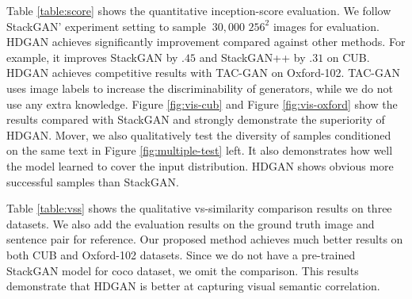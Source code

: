 \documentclass[10pt,twocolumn,letterpaper]{article}
\begin{document}
Table \ref{table:score} shows the quantitative inception-score evaluation. We follow StackGAN' experiment setting to sample ${~}30,000$ $256^2$ images for evaluation.
HDGAN achieves significantly improvement compared against other methods. For example, it improves StackGAN by $.45$ and StackGAN++ by $.31$ on CUB.
HDGAN achieves competitive results with TAC-GAN on Oxford-102. TAC-GAN uses image labels to increase the discriminability of generators, while we do not use any extra knowledge. Figure \ref{fig:vis-cub} and Figure \ref{fig:vis-oxford} show the results compared with StackGAN and strongly demonstrate the superiority of HDGAN. Mover, we also qualitatively test the diversity of samples conditioned on the same text in Figure \ref{fig:multiple-test} left. It also demonstrates how well the model learned to cover the input distribution. HDGAN shows obvious more successful samples than StackGAN.

Table \ref{table:vss} shows the qualitative vs-similarity comparison results on three datasets. We also add the evaluation results on the ground truth image and sentence pair for reference. Our proposed method achieves much better results on both CUB and Oxford-102 datasets. Since we do not have a pre-trained  StackGAN model for coco dataset, we omit the comparison. This results demonstrate that HDGAN is better at capturing visual semantic correlation.

\end{document}
